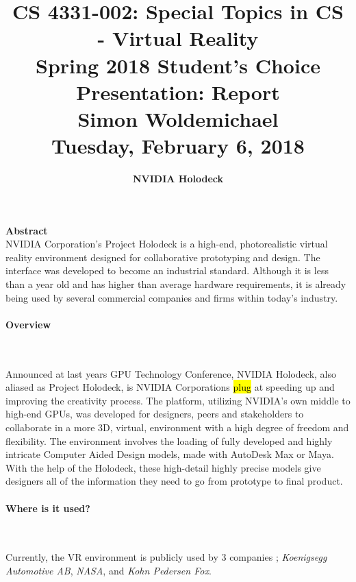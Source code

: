 \documentclass[11pt]{article}
\begin{document}
\title{\Large CS 4331-002: Special Topics in CS - Virtual Reality \\ Spring 2018 Student's Choice Presentation: Report \\ \Large Simon Woldemichael \\ Tuesday, February 6, 2018 \\}
\author{\LARGE \textbf{NVIDIA Holodeck}}
\date{}

\maketitle
\vspace{-1cm}
\hspace{30pt}
\begin{center}
\textbf{Abstract}\\

NVIDIA Corporation's Project Holodeck is a high-end, photorealistic virtual reality environment designed for collaborative prototyping and design. The interface was developed to become an industrial standard. Although it is less than a year old and has higher than average hardware requirements, it is already being used by several commercial companies and firms within today's industry.
\end{center}

\paragraph{Overview} ~ \par 
Announced at last years GPU Technology Conference, NVIDIA Holodeck, also aliased as Project Holodeck, is NVIDIA Corporations \hl{plug} at speeding up and improving the creativity process. The platform, utilizing NVIDIA's own middle to high-end GPUs, was developed for designers, peers and stakeholders to collaborate in a more 3D, virtual, environment \cite{WEBSITE:2} with a high degree of freedom and flexibility. The environment involves the loading of fully developed and highly intricate Computer Aided Design models, made with AutoDesk Max or Maya. With the help of the Holodeck, these high-detail highly precise models give designers all of the information they need to go from prototype to final product.

\paragraph{Where is it used?} ~ \par 
	Currently, the VR environment is publicly used by 3 companies \cite{WEBSITE:2}; \textit{Koenigsegg Automotive AB}, \textit{NASA}, and \textit{Kohn Pedersen Fox}.
	
\end{document}
